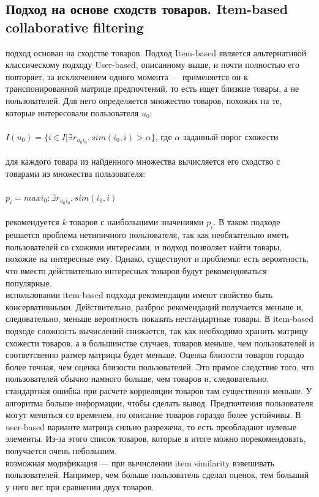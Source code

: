 \documentclass{article}
\newcommand\tab[1][1cm]{\hspace*{#1}}
\begin{document}
\subsection{Подход на основе сходств товаров. Item-based collaborative filtering}
 подход основан на сходстве товаров. Подход Item-based является альтернативой классическому подходу User-based, описанному выше, и почти полностью его повторяет, за исключением одного момента — применяется он к транспонированной матрице предпочтений, то есть ищет близкие товары, а не пользователей. Для него определяется множество товаров, похожих на те, которые интересовали пользователя ﻿$u_0$:\\
\\
\tab$I(u_0)=\{i\in I|\exists r_{u_0i_0}, sim(i_0,i)>\alpha \}$, где ﻿$\alpha$ заданный порог схожести\\
\\
 для каждого товара из найденного множества вычисляется его сходство с товарами из множества пользователя:\\
\\
\tab$p_i=max i_0: \exists r_{u_0i_0},sim(i_0,i)$\\
\\
 рекомендуется ﻿$k$ товаров с наибольшими значениями $p_i$﻿. В таком подходе решается проблема нетипичного пользователя, так как необязательно иметь пользователей со схожими интересами, и подход позволяет найти товары, похожие на интересные ему. Однако, существуют и проблемы: есть вероятность, что вместо действительно интересных товаров будут рекомендоваться популярные.\\
 использовании item-based подхода рекомендации имеют свойство быть консервативными. Действительно, разброс рекомендаций получается меньше и, следовательно, меньше вероятность показать нестандартные товары. В item-based подходе сложность вычислений снижается, так как необходимо хранить матрицу схожести товаров, а в большинстве случаев, товаров меньше, чем пользователей и соответсвенно размер матрицы будет меньше. Оценка близости товаров гораздо более точная, чем оценка близости пользователей. Это прямое следствие того, что пользователей обычно намного больше, чем товаров и, следовательно, стандартная ошибка при расчете корреляции товаров там существенно меньше. У алгоритма больше информации, чтобы сделать вывод. Предпочтения пользователя могут меняться со временем, но описание товаров гораздо более устойчивы. В user-based варианте матрица сильно разрежена, то есть преобладают нулевые элементы. Из-за этого список товаров, которые в итоге можно порекомендовать, получается очень небольшим.\\
 возможная модификация — при вычислении item similarity взвешивать пользователей. Например, чем больше пользователь сделал оценок, тем больший у него вес при сравнении двух товаров.
\end{document}
